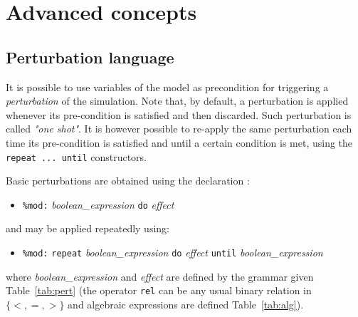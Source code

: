 \documentclass[11pt]{book}
\def\ttt#1{\texttt{#1}}
\def\set#1{\{#1\}}
\def\ITE#1{\begin{itemize}#1\end{itemize}}
\begin{document}
\chapter{Advanced concepts}\label{chap:advanced}

\section{Perturbation language}\label{sec:mod}

It is possible to use variables of the model as precondition for triggering a \emph{perturbation} of the simulation. Note that, by default, a perturbation is applied whenever its pre-condition is satisfied and then discarded. Such perturbation is called \emph{"one shot"}. It is however possible to re-apply the same perturbation each time its pre-condition is satisfied and until a certain condition is met, using the \ttt{repeat ... until} constructors.

Basic perturbations are obtained using the declaration :
\ITE{
\item[] \ttt{\%mod:} \textit{boolean\_expression} \ttt{do} \textit{effect} 
}
and may be applied repeatedly using:
\ITE{
\item[] \ttt{\%mod:} \ttt{repeat} \textit{boolean\_expression} \ttt{do} \textit{effect} \ttt{until} \textit{boolean\_expression} 
}
where \textit{boolean\_expression} and \textit{effect} are defined by the grammar given  Table~\ref{tab:pert} (the operator \ttt{rel} can be any usual binary relation in $\set{<,=,>}$ and algebraic expressions are defined Table~\ref{tab:alg}).
\end{document}
